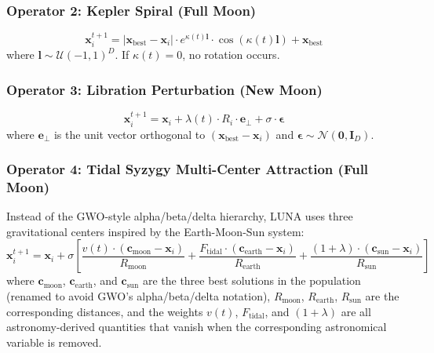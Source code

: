 \documentclass[review]{elsarticle}
\theoremstyle{definition}
\begin{document}
\subsubsection{Operator 2: Kepler Spiral (Full Moon)}
\begin{equation}
\mathbf{x}_i^{t+1} = |\mathbf{x}_{\mathrm{best}} - \mathbf{x}_i| \cdot e^{\kappa(t) \mathbf{l}} \cdot \cos(\kappa(t) \mathbf{l}) + \mathbf{x}_{\mathrm{best}}
\label{eq:op2}
\end{equation}
where $\mathbf{l} \sim \mathcal{U}(-1, 1)^D$. If $\kappa(t) = 0$, no rotation occurs.

\subsubsection{Operator 3: Libration Perturbation (New Moon)}
\begin{equation}
\mathbf{x}_i^{t+1} = \mathbf{x}_i + \lambda(t) \cdot R_i \cdot \mathbf{e}_\perp + \sigma \cdot \boldsymbol{\epsilon}
\label{eq:op3}
\end{equation}
where $\mathbf{e}_\perp$ is the unit vector orthogonal to $(\mathbf{x}_{\mathrm{best}} - \mathbf{x}_i)$ and $\boldsymbol{\epsilon} \sim \mathcal{N}(\mathbf{0}, \mathbf{I}_D)$.

\subsubsection{Operator 4: Tidal Syzygy Multi-Center Attraction (Full Moon)}

Instead of the GWO-style alpha/beta/delta hierarchy, LUNA uses three gravitational centers inspired by the Earth-Moon-Sun system:
\begin{equation}
\mathbf{x}_i^{t+1} = \mathbf{x}_i + \sigma \left[\frac{v(t) \cdot (\mathbf{c}_{\mathrm{moon}} - \mathbf{x}_i)}{R_{\mathrm{moon}}} + \frac{F_{\mathrm{tidal}} \cdot (\mathbf{c}_{\mathrm{earth}} - \mathbf{x}_i)}{R_{\mathrm{earth}}} + \frac{(1+\lambda) \cdot (\mathbf{c}_{\mathrm{sun}} - \mathbf{x}_i)}{R_{\mathrm{sun}}}\right]
\label{eq:op4}
\end{equation}
where $\mathbf{c}_{\mathrm{moon}}$, $\mathbf{c}_{\mathrm{earth}}$, and $\mathbf{c}_{\mathrm{sun}}$ are the three best solutions in the population (renamed to avoid GWO's alpha/beta/delta notation), $R_{\mathrm{moon}}$, $R_{\mathrm{earth}}$, $R_{\mathrm{sun}}$ are the corresponding distances, and the weights $v(t)$, $F_{\mathrm{tidal}}$, and $(1+\lambda)$ are all astronomy-derived quantities that vanish when the corresponding astronomical variable is removed.
\end{document}
